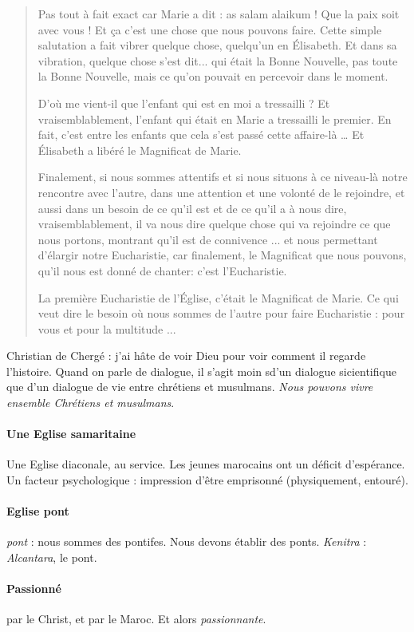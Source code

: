 \begin{quote}
    Pas tout à fait exact car Marie a dit : as salam alaikum ! Que la paix soit avec vous ! Et ça c'est une chose que nous pouvons faire. Cette simple salutation a fait vibrer quelque chose, quelqu'un en Élisabeth. Et dans sa vibration, quelque chose s'est dit... qui était la Bonne Nouvelle, pas toute la Bonne Nouvelle, mais ce qu'on pouvait en percevoir dans le moment.
    
    D'où me vient-il que l'enfant qui est en moi a tressailli ? Et vraisemblablement, l'enfant qui était en Marie a tressailli le premier. En fait, c'est entre les enfants que cela s'est passé cette affaire-là … Et Élisabeth a libéré le Magnificat de Marie. 
    
    
    Finalement, si nous sommes attentifs et si nous situons à ce niveau-là notre rencontre avec l'autre, dans une attention et une volonté de le rejoindre, et aussi dans un besoin de ce qu'il est et de ce qu'il a à nous dire, vraisemblablement, il va nous dire quelque chose qui va rejoindre ce que nous portons, montrant qu'il est de connivence ... et nous permettant d'élargir notre Eucharistie, car finalement, le Magnificat que nous pouvons, qu'il nous est donné de chanter: c'est l'Eucharistie. 
    
    
    La première Eucharistie de l’Église, c'était le Magnificat de Marie. Ce qui veut dire le besoin où nous sommes de l'autre pour faire Eucharistie : pour vous et pour la multitude ... 
\end{quote}
Christian de Chergé  : j'ai hâte de voir Dieu pour voir comment il regarde l'histoire.
Quand on parle de dialogue, il s'agit moin sd'un dialogue sicientifique que d'un dialogue de vie entre chrétiens et musulmans. \textit{Nous pouvons vivre ensemble Chrétiens et musulmans}.

\paragraph{Une Eglise samaritaine} Une Eglise diaconale, au service. Les jeunes marocains ont un déficit d'espérance. Un facteur psychologique : impression d'être emprisonné (physiquement, entouré).

\paragraph{Eglise pont} \textit{pont} : nous sommes des pontifes. Nous devons établir des ponts. \textit{Kenitra} : \textit{Alcantara}, le pont. 

\paragraph{Passionné} par le Christ, et par le Maroc. Et alors \textit{passionnante}. 


